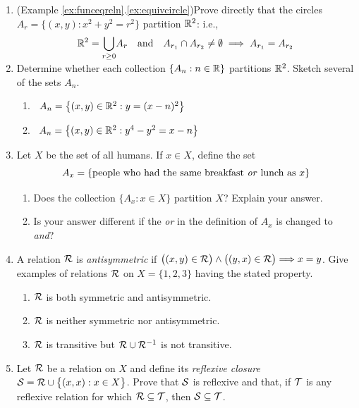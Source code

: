 \begin{exercises}{}{}
\begin{enumerate}
	\item (Example \ref*{ex:funceqreln}.\ref{ex:equivcircle})\lstsp Prove directly that the circles $A_r=\bigl\{(x,y):x^2+y^2=r^2\bigr\}$ partition $\mathbb{R}^2$: i.e.,
	\[
		\mathbb{R}^2=\smash[b]{\bigcup_{r\ge 0}}A_r\quad\text{and}\quad A_{r_1}\cap A_{r_2}\neq\emptyset \implies A_{r_1}=A_{r_2}
	\]

	\goodbreak

	\item Determine whether each collection $\{A_n:n\in\mathbb{R}\}$ partitions $\mathbb{R}^2$. Sketch several of the sets $A_n$.
	\begin{enumerate}
		\item {} \ $A_n=\big\{(x,y)\in\mathbb{R}^2:y=(x-n)^2\big\}$
		\setcounter{enumii}{2}
	  \item {} \ $A_n=\big\{(x,y)\in\mathbb{R}^2:y^4-y^2=x-n\big\}$
	\end{enumerate}
	
	
	\item Let $X$ be the set of all humans. If $x\in X$, define the set
	\[
		A_x=\{\text{people who had the same breakfast \emph{or} lunch as $x$}\}
	\]
	\begin{enumerate}
	  \item Does the collection $\{A_x:x\in X\}$ partition $X$? Explain your answer.
	  \item Is your answer different if the \emph{or} in the definition of $A_x$ is changed to \emph{and}?
	\end{enumerate}
	
	
  \item\label{exs:anstisymm} A relation $\mathcal{R}$ is \emph{antisymmetric} if $\bigl((x,y)\in \mathcal{R}\bigr)\wedge\bigl((y,x)\in \mathcal{R}\bigr)\Longrightarrow x=y$. Give examples of relations $\mathcal{R}$ on $X=\{1,2,3\}$ having the stated property.
	\begin{enumerate}
		\item $\mathcal{R}$ is both symmetric and antisymmetric.
		\item $\mathcal{R}$ is neither symmetric nor antisymmetric.
		\item $\mathcal{R}$ is transitive but $\mathcal{R}\cup \mathcal{R}^{-1}$ is not transitive.
	\end{enumerate}
	
	
	\item Let $\mathcal{R}$ be a relation on $X$ and define its \emph{reflexive closure} $\mathcal{S}=\mathcal{R}\cup\bigl\{(x,x):x\in X\bigr\}$. Prove that $\mathcal{S}$ is reflexive and that, if $\mathcal{T}$ is any reflexive relation for which $\mathcal{R}\subseteq\mathcal{T}$, then $\mathcal{S}\subseteq\mathcal{T}$.
	

\end{enumerate}
\end{exercises}
